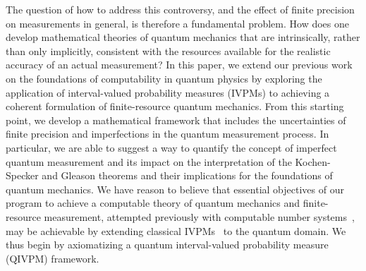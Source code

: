 \documentclass[english,reprint, aps, prl,superscriptaddress, showpacs,
showkeys, longbibliography, amsmath, amssymb, floatfix]{revtex4-1}
\theoremstyle{plain}
\theoremstyle{definition}
\begin{document}
The question of how to address this controversy, and the effect of 
finite precision on measurements in general, is therefore 
a fundamental problem.  How does one
develop mathematical theories of quantum mechanics that are
intrinsically, rather than only implicitly, consistent with the
resources available for the realistic accuracy of an actual
measurement?   In this paper, we extend our previous work on the
foundations of computability in quantum physics by exploring the
application of interval-valued probability measures (IVPMs) to
achieving a coherent formulation of finite-resource quantum mechanics.
From this starting point, we develop a mathematical framework that includes the
uncertainties of finite precision and imperfections in the quantum
measurement process.  In particular, we are able to suggest a way to quantify
the concept of imperfect quantum measurement and its impact on the interpretation of
the Kochen-Specker and Gleason theorems and their implications for the
foundations of quantum mechanics.  We have reason to believe that
essential objectives of our program to achieve a computable theory of
quantum mechanics and finite-resource measurement, attempted
previously with computable number
systems~\cite{usat,geometry2013apsrev4,DQT2014}, may be achievable by
extending classical IVPMs~\cite{JamisonLodwick2004} to the quantum
domain.  We thus begin by axiomatizing a quantum interval-valued
probability measure (QIVPM) framework.
\end{document}
